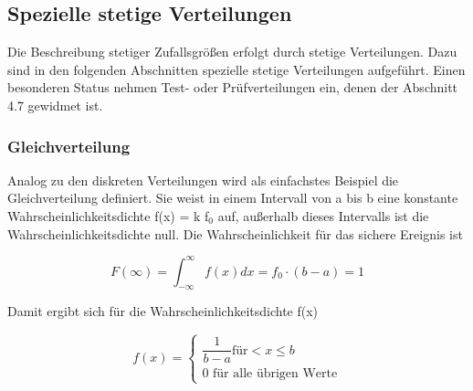 \begin{table}[H]
{\begin{tabular}{| c | c | c | c | c |}
\parbox[c][0.5in][c]{1.3in}{\centering{}\selectfont{Geometrische Verteilung}} & 
\parbox[c][0.5in][c]{1.1in}{\centering{}\selectfont{geom.pmf}} &
\parbox[c][0.5in][c]{1.1in}{\centering{}\selectfont{geom.cdf}} & 
\parbox[c][0.5in][c]{1.1in}{\centering{}\selectfont{geom.ppf}}  & 
\parbox[c][0.5in][c]{1.4in}{\centering{}\selectfont{geom.rvs}} \\
\hline

\end{tabular}%
}
\label{tab:fourthirteen}
\end{table}

\clearpage 

\subsection{Spezielle stetige Verteilungen}

\noindent Die Beschreibung stetiger Zufallsgr\"{o}{\ss}en erfolgt durch stetige Verteilungen. Dazu sind in den folgenden Abschnitten spezielle stetige Verteilungen aufgef\"{u}hrt. Einen besonderen Status nehmen Test- oder Pr\"{u}fverteilungen ein, denen der Abschnitt 4.7 gewidmet ist.

\subsubsection{Gleichverteilung}

\noindent Analog zu den diskreten Verteilungen wird als einfachstes Beispiel die Gleichverteilung definiert. Sie weist in einem Intervall von a bis b eine konstante Wahrscheinlichkeitsdichte f(x) = k f$_{0}$ auf, au{\ss}erhalb dieses Intervalls ist die Wahrscheinlichkeitsdichte null. Die Wahrscheinlichkeit f\"{u}r das sichere Ereignis ist

\begin{equation}\label{eq:fourhundredsixtyfour}
F(\infty )=\int _{-\infty }^{\infty }f(x)dx =f_{0} \cdot (b-a)=1
\end{equation}

\noindent Damit ergibt sich f\"{u}r die Wahrscheinlichkeitsdichte f(x) 

\begin{equation}\label{eq:fourhundredsixtyfive}
f(x)=\left\{\begin{array}{l} {\dfrac{1}{b-a} \text{für} < x\le  b} \\ 
{0 \text{ für alle übrigen Werte} } \end{array}\right.
\end{equation}

